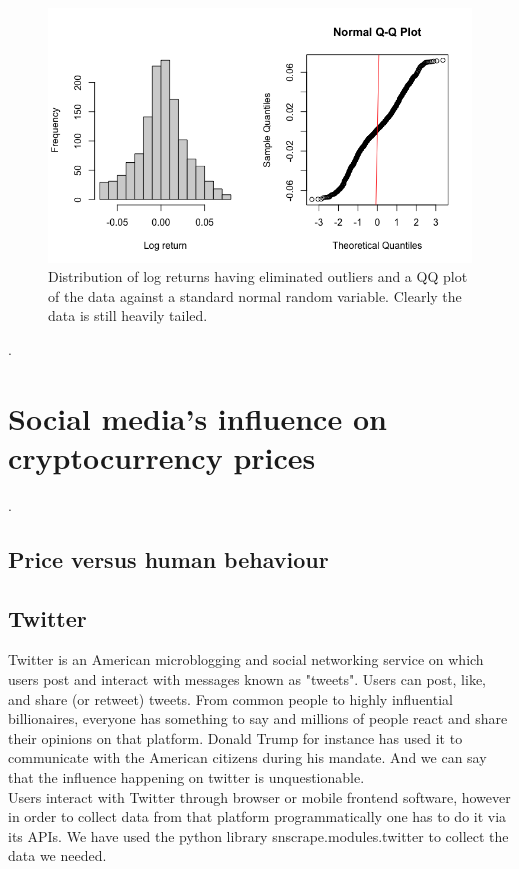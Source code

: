 \documentclass[twoside]{report}
\begin{document}
\begin{spacing}{1}
\begin{figure}
    \centering
    \includegraphics[width=\linewidth]{Extremal Modelling/distplots_sans_outliers.png}
    \caption{Distribution of log returns having eliminated outliers and a QQ plot of the data against a standard normal random variable. Clearly the data is still heavily tailed.}
    \label{fig:distplots_sans_outliers}
\end{figure}



.

\chapter{Social media's influence on cryptocurrency prices}
.
\section{Price versus human behaviour}

\section{Twitter}
Twitter is an American microblogging and social networking service on which users post and interact with messages known as "tweets". Users can post, like, and share (or retweet) tweets.
From common people to highly influential billionaires, everyone has something to say and millions of people react and share their opinions on that platform. Donald Trump for instance has used it to communicate with the American citizens during his mandate. And we can say that the influence happening on twitter is unquestionable.\\

Users interact with Twitter through browser or mobile frontend software, however in order to collect data from that platform programmatically one has to do it via its APIs.
We have used the python library snscrape.modules.twitter to collect the data we needed.\\



\end{spacing}
\end{document}
